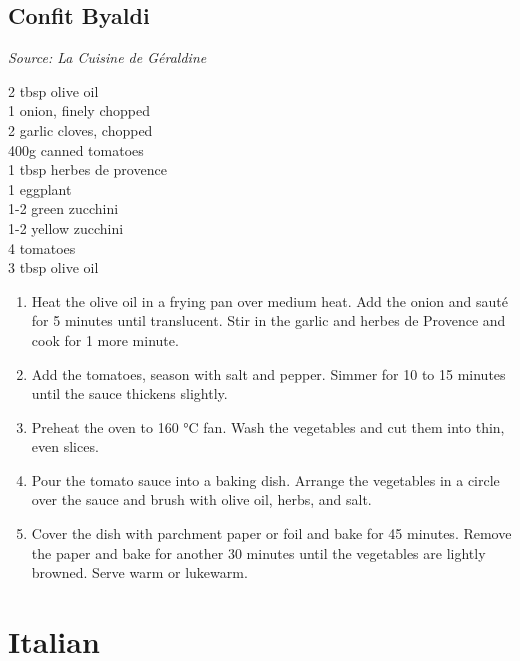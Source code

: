 \documentclass{report}
\begin{document}
\section{Confit Byaldi}
\textit{Source: La Cuisine de Géraldine}\\
\begin{minipage}[t]{0.21\textwidth} \vspace{0pt}
\begin{flushleft}
2 tbsp olive oil\\
1 onion, finely chopped\\
2 garlic cloves, chopped\\
400g canned tomatoes\\
1 tbsp herbes de provence\\
1 eggplant\\
1-2 green zucchini\\
1-2 yellow zucchini\\
4 tomatoes\\
3 tbsp olive oil\\
\end{flushleft}
\end{minipage}
\hfill
\begin{minipage}[t]{0.78\textwidth} \vspace{0pt}
	\begin{enumerate}
		\item Heat the olive oil in a frying pan over medium heat. Add the onion and sauté for 5 minutes until translucent. Stir in the garlic and herbes de Provence and cook for 1 more minute.
		\item Add the tomatoes, season with salt and pepper. Simmer for 10 to 15 minutes until the sauce thickens slightly.
		\item Preheat the oven to 160 °C fan. Wash the vegetables and cut them into thin, even slices.
		\item Pour the tomato sauce into a baking dish. Arrange the vegetables in a circle over the sauce and brush with olive oil, herbs, and salt.
		\item Cover the dish with parchment paper or foil and bake for 45 minutes. Remove the paper and bake for another 30 minutes until the vegetables are lightly browned. Serve warm or lukewarm.
	\end{enumerate}	
\end{minipage}

\chapter{Italian}
\end{document}
